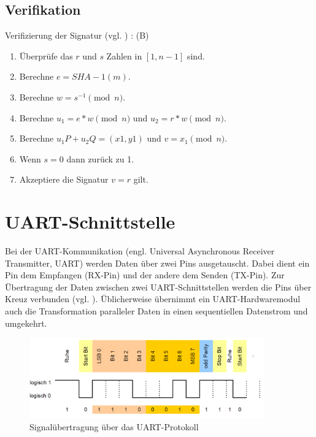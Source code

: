 \subsection{Verifikation}
Verifizierung der Signatur (vgl. \cite{hwimp}) : (B)

\begin{enumerate}
\item Überprüfe das $r$ und $s$ Zahlen in $[1, n - 1]$ sind.
\item Berechne $e = SHA - 1(m)$.
\item Berechne $w = s^{-1}\pmod{n}$.
\item Berechne $u_1 = e * w \pmod{n}$ und $u_2 = r * w \pmod{n}$.
\item Berechne $u_1 P + u_2 Q = (x1, y1)$ und $v = x_1 \pmod{n}$.
\item Wenn $s = 0$ dann zurück zu 1.
\item Akzeptiere die Signatur $v = r$ gilt.
\end{enumerate}






\section{UART-Schnittstelle} \label{sec:iuart}

Bei der UART-Kommunikation (engl. Universal Asynchronous Receiver Transmitter, UART) werden Daten über zwei Pins ausgetauscht. Dabei dient ein Pin dem Empfangen (RX-Pin) und der andere dem Senden (TX-Pin). Zur Übertragung der Daten zwischen zwei UART-Schnittstellen werden die Pins über Kreuz verbunden (vgl. \cite{uart}). Üblicherweise übernimmt ein UART-Hardwaremodul auch die Transformation paralleler Daten in einen sequentiellen Datenstrom und umgekehrt.

\begin{figure}[H]
	\centering
   \includegraphics[width=0.90\textwidth]{bilder/uart}
	\caption{Signalübertragung über das UART-Protokoll}
	\label{fig:uart}
\end{figure}

